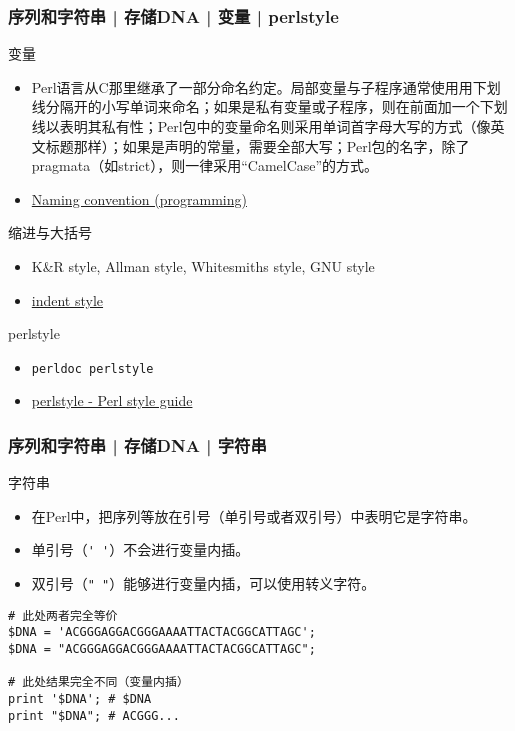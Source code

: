 \begin{frame}[fragile]
  \frametitle{序列和字符串 | 存储DNA | 变量 | perlstyle}
  \begin{block}{变量}
    \begin{itemize}
      \item {\small 
Perl语言从C那里继承了一部分命名约定。局部变量与子程序通常使用用下划线分隔开的小写单词来命名；如果是私有变量或子程序，则在前面加一个下划线以表明其私有性；Perl包中的变量命名则采用单词首字母大写的方式（像英文标题那样）；如果是声明的常量，需要全部大写；Perl包的名字，除了pragmata（如strict），则一律采用“CamelCase”的方式。}
      \item \href{https://en.wikipedia.org/wiki/Naming\_convention\_(programming)}{Naming convention (programming)}
    \end{itemize}
  \end{block}
  \pause
  \vspace{-0.5em}
  \begin{block}{缩进与大括号}
    \begin{itemize}
      \item K\&R style, Allman style, Whitesmiths style, GNU style
      \item \href{http://catb.org/jargon/html/I/indent-style.html}{indent style}
    \end{itemize}
  \end{block}
  \pause
  \vspace{-0.5em}
  \begin{block}{perlstyle}
    \begin{itemize}
      \item \verb|perldoc perlstyle|
      \item \href{http://perldoc.perl.org/perlstyle.html}{perlstyle - Perl style guide}
    \end{itemize}
  \end{block}
\end{frame}

\begin{frame}[fragile]
  \frametitle{序列和字符串 | 存储DNA | \alert{字符串}}
  \begin{block}{字符串}
    \begin{itemize}
      \item 在Perl中，把序列等放在引号（单引号或者双引号）中表明它是字符串。
      \item 单引号（\verb|' '|）不会进行变量内插。
      \item 双引号（\verb|" "|）能够进行变量内插，可以使用转义字符。
    \end{itemize}
  \end{block}
  \pause
\begin{lstlisting}
# 此处两者完全等价
$DNA = 'ACGGGAGGACGGGAAAATTACTACGGCATTAGC';
$DNA = "ACGGGAGGACGGGAAAATTACTACGGCATTAGC";

# 此处结果完全不同（变量内插）
print '$DNA'; # $DNA
print "$DNA"; # ACGGG...
\end{lstlisting}
\end{frame}

